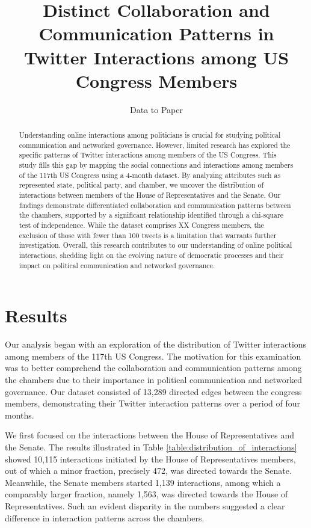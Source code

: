 \documentclass[11pt]{article}
\title{Distinct Collaboration and Communication Patterns in Twitter Interactions among US Congress Members}
\author{Data to Paper}
\begin{document}
\maketitle
\begin{abstract}
Understanding online interactions among politicians is crucial for studying political communication and networked governance. However, limited research has explored the specific patterns of Twitter interactions among members of the US Congress. This study fills this gap by mapping the social connections and interactions among members of the 117th US Congress using a 4-month dataset. By analyzing attributes such as represented state, political party, and chamber, we uncover the distribution of interactions between members of the House of Representatives and the Senate. Our findings demonstrate differentiated collaboration and communication patterns between the chambers, supported by a significant relationship identified through a chi-square test of independence. While the dataset comprises XX Congress members, the exclusion of those with fewer than 100 tweets is a limitation that warrants further investigation. Overall, this research contributes to our understanding of online political interactions, shedding light on the evolving nature of democratic processes and their impact on political communication and networked governance.
\end{abstract}
\section*{Results}

Our analysis began with an exploration of the distribution of Twitter interactions among members of the 117th US Congress. The motivation for this examination was to better comprehend the collaboration and communication patterns among the chambers due to their importance in political communication and networked governance. Our dataset consisted of 13,289 directed edges between the congress members, demonstrating their Twitter interaction patterns over a period of four months. 

We first focused on the interactions between the House of Representatives and the Senate. The results illustrated in Table {}\ref{table:distribution_of_interactions} showed 10,115 interactions initiated by the House of Representatives members, out of which a minor fraction, precisely 472, was directed towards the Senate. Meanwhile, the Senate members started 1,139 interactions, among which a comparably larger fraction, namely 1,563, was directed towards the House of Representatives. Such an evident disparity in the numbers suggested a clear difference in interaction patterns across the chambers.
\end{document}
